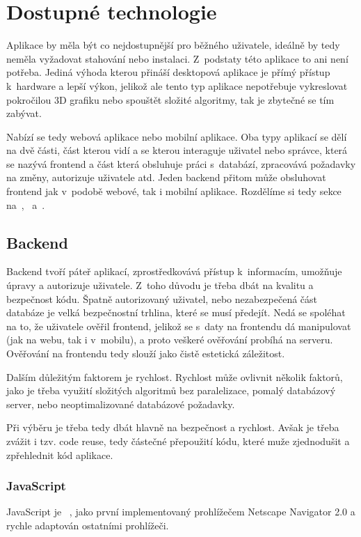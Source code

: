 \section{Dostupné technologie}
\label{sc:available_technologies}
Aplikace by měla být co nejdostupnější pro běžného uživatele, ideálně by tedy neměla vyžadovat stahování nebo instalaci. Z~podstaty této aplikace to ani není potřeba. Jediná výhoda kterou přináší desktopová aplikace je přímý přístup k~hardware a lepší výkon, jelikož ale tento typ aplikace nepotřebuje vykreslovat pokročilou 3D grafiku nebo spouštět složité algoritmy, tak je zbytečné se tím zabývat.

Nabízí se tedy webová aplikace nebo mobilní aplikace. Oba typy aplikací se dělí na dvě části, část kterou vidí a se kterou interaguje uživatel nebo správce, která se nazývá frontend a část která obsluhuje práci s~databází, zpracovává požadavky na změny, autorizuje uživatele atd. Jeden backend přitom může obsluhovat frontend jak v~podobě webové, tak i mobilní aplikace. Rozdělíme si tedy sekce na~,~ a~.

\subsection{Backend}
\label{ss:backend}
Backend tvoří páteř aplikací, zprostředkovává přístup k~informacím, umožňuje úpravy a autorizuje uživatele. Z~toho důvodu je třeba dbát na kvalitu a bezpečnost kódu. Špatně autorizovaný uživatel, nebo nezabezpečená část databáze je velká bezpečnostní trhlina, které se musí předejít. Nedá se spoléhat na to, že uživatele ověřil frontend, jelikož se s~daty na frontendu dá manipulovat (jak na webu, tak i v~mobilu), a proto veškeré ověřování probíhá na serveru. Ověřování na frontendu tedy slouží jako čistě estetická záležitost.

Dalším důležitým faktorem je rychlost. Rychlost může ovlivnit několik faktorů, jako je třeba využití složitých algoritmů bez paralelizace, pomalý databázový server, nebo neoptimalizované databázové požadavky.

Při výběru je třeba tedy dbát hlavně na bezpečnost a rychlost. Avšak je třeba zvážit i tzv. code reuse, tedy částečné přepoužití kódu, které muže zjednodušit a zpřehlednit kód aplikace.

\subsubsection*{JavaScript}
JavaScript je \emph{}~\cite{netscapecommunicationscorporation_1995_press}, jako první implementovaný prohlížečem Netscape Navigator 2.0 a rychle adaptován ostatními prohlížeči.


